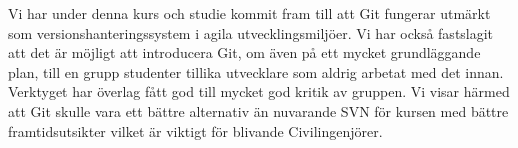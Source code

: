 Vi har under denna kurs och studie kommit fram till att Git fungerar utmärkt som versionshanteringssystem i agila utvecklingsmiljöer. Vi har också fastslagit att det är möjligt att introducera Git, om även på ett mycket grundläggande plan, till en grupp studenter tillika utvecklare som aldrig arbetat med det innan. Verktyget har överlag fått god till mycket god kritik av gruppen. Vi visar härmed att Git skulle vara ett bättre alternativ än nuvarande SVN för kursen med bättre framtidsutsikter vilket är viktigt för blivande Civilingenjörer.